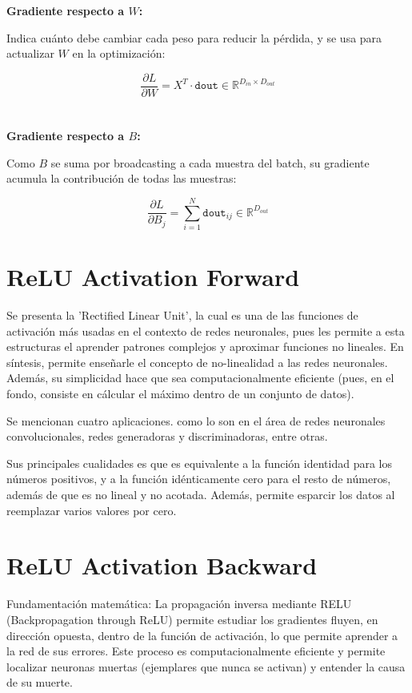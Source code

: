 \documentclass[12pt, letterpaper]{article}
\begin{document}
\textbf{Gradiente respecto a $W$:}

Indica cuánto debe cambiar cada peso para reducir la pérdida, y se usa para actualizar $W$ en la optimización:

\[
\frac{\partial L}{\partial W} = X^T \cdot \texttt{dout} \in \mathbb{R}^{D_{in} \times D_{out}}
\] \\ \\ 

\textbf{Gradiente respecto a $B$:}

Como $B$ se suma por broadcasting a cada muestra del batch, su gradiente acumula la contribución de todas las muestras:

\[
\frac{\partial L}{\partial B_j} = \sum_{i=1}^{N} \texttt{dout}_{ij} \in \mathbb{R}^{D_{out}}
\]



\newpage

\section{ReLU Activation Forward}

Se presenta la 'Rectified Linear Unit', la cual es una de las funciones de activación más usadas en el contexto de redes neuronales, pues les permite a esta estructuras el aprender patrones complejos y aproximar funciones no lineales. En síntesis, permite enseñarle el concepto de no-linealidad a las redes neuronales. Además, su simplicidad hace que sea computacionalmente eficiente (pues, en el fondo, consiste en cálcular el máximo dentro de un conjunto de datos).

Se mencionan cuatro aplicaciones. como lo son en el área de redes neuronales convolucionales, redes generadoras y discriminadoras, entre otras.

Sus principales cualidades es que es equivalente a la función identidad para los números positivos, y a la función idénticamente cero para el resto de números, además de que es no lineal y no acotada. Además, permite esparcir los datos al reemplazar varios valores por cero.

\newpage

\section{ReLU Activation Backward}

Fundamentación matemática: La propagación inversa mediante RELU (Backpropagation through ReLU) permite estudiar los gradientes fluyen, en dirección opuesta, dentro de la función de activación, lo que permite aprender a la red de sus errores. Este proceso es computacionalmente eficiente y permite localizar neuronas muertas (ejemplares que nunca se activan) y entender la causa de su muerte.
\end{document}
